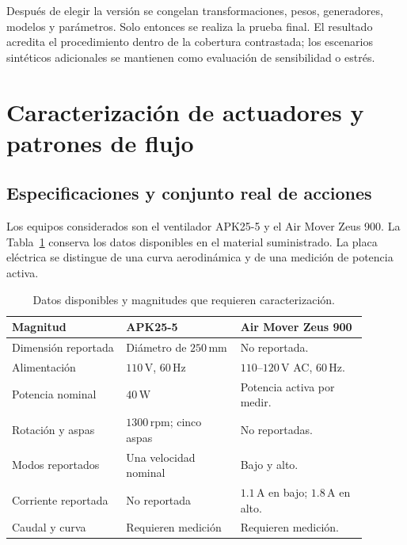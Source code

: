 Después de elegir la versión se congelan transformaciones, pesos, generadores, modelos y parámetros. Solo entonces se realiza la prueba final. El resultado acredita el procedimiento dentro de la cobertura contrastada; los escenarios sintéticos adicionales se mantienen como evaluación de sensibilidad o estrés.

\section{Caracterización de actuadores y patrones de flujo}
\label{met:actuadores}

\subsection{Especificaciones y conjunto real de acciones}

Los equipos considerados son el ventilador APK25-5 y el Air Mover Zeus 900. La Tabla~\ref{met:tabla_actuadores} conserva los datos disponibles en el material suministrado. La placa eléctrica se distingue de una curva aerodinámica y de una medición de potencia activa.
\begin{table}[htbp]
\centering
\small
\caption{Datos disponibles y magnitudes que requieren caracterización.}
\label{met:tabla_actuadores}
\begin{tabular}{>{\raggedright\arraybackslash}p{0.29\linewidth}>{\raggedright\arraybackslash}p{0.29\linewidth}>{\raggedright\arraybackslash}p{0.31\linewidth}}
\toprule
Magnitud & APK25-5 & Air Mover Zeus 900 \\
\midrule
Dimensión reportada & Diámetro de $250\,\mathrm{mm}$ & No reportada. \\
Alimentación & $110\,\mathrm V$, $60\,\mathrm{Hz}$ & $110$--$120\,\mathrm V$ AC, $60\,\mathrm{Hz}$. \\
Potencia nominal & $40\,\mathrm W$ & Potencia activa por medir. \\
Rotación y aspas & $1300\,\mathrm{rpm}$; cinco aspas & No reportadas. \\
Modos reportados & Una velocidad nominal & Bajo y alto. \\
Corriente reportada & No reportada & $1.1\,\mathrm A$ en bajo; $1.8\,\mathrm A$ en alto. \\
Caudal y curva & Requieren medición & Requieren medición. \\
\bottomrule
\end{tabular}
\end{table}

